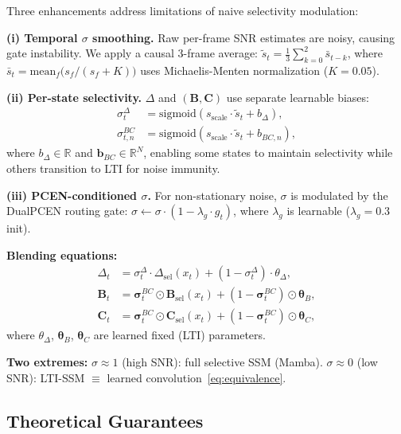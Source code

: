 \documentclass[journal]{IEEEtran}
\begin{document}
Three enhancements address limitations of naive selectivity modulation:

\smallskip\noindent\textbf{(i) Temporal $\sigma$ smoothing.}
Raw per-frame SNR estimates are noisy, causing gate instability. We apply a causal 3-frame average:
$\tilde{s}_t = \frac{1}{3}\sum_{k=0}^{2} \bar{s}_{t-k}$, where $\bar{s}_t = \text{mean}_f\big(s_f/(s_f{+}K)\big)$ uses Michaelis-Menten normalization ($K{=}0.05$).

\smallskip\noindent\textbf{(ii) Per-state selectivity.}
$\Delta$ and $(\mathbf{B}, \mathbf{C})$ use separate learnable biases:
\begin{align}
\sigma^\Delta_t &= \text{sigmoid}(s_{\text{scale}} \cdot \tilde{s}_t + b_\Delta), \label{eq:sigma_dt} \\
\sigma^{BC}_{t,n} &= \text{sigmoid}(s_{\text{scale}} \cdot \tilde{s}_t + b_{BC,n}), \label{eq:sigma_bc}
\end{align}
where $b_\Delta \in \mathbb{R}$ and $\mathbf{b}_{BC} \in \mathbb{R}^N$, enabling some states to maintain selectivity while others transition to LTI for noise immunity.

\smallskip\noindent\textbf{(iii) PCEN-conditioned $\sigma$.}
For non-stationary noise, $\sigma$ is modulated by the DualPCEN routing gate:
$\sigma \leftarrow \sigma \cdot (1 - \lambda_g \cdot g_t)$,
where $\lambda_g$ is learnable ($\lambda_g{=}0.3$ init).

\smallskip\noindent\textbf{Blending equations:}
\begin{align}
\Delta_t &= \sigma^\Delta_t \cdot \Delta_{\text{sel}}(x_t) + (1{-}\sigma^\Delta_t) \cdot \theta_\Delta, \label{eq:blend_dt} \\
\mathbf{B}_t &= \bm{\sigma}^{BC}_t \odot \mathbf{B}_{\text{sel}}(x_t) + (1{-}\bm{\sigma}^{BC}_t) \odot \bm{\theta}_B, \label{eq:blend_b} \\
\mathbf{C}_t &= \bm{\sigma}^{BC}_t \odot \mathbf{C}_{\text{sel}}(x_t) + (1{-}\bm{\sigma}^{BC}_t) \odot \bm{\theta}_C, \label{eq:blend_c}
\end{align}
where $\theta_\Delta$, $\bm{\theta}_B$, $\bm{\theta}_C$ are learned fixed (LTI) parameters.

\smallskip\noindent\textbf{Two extremes:}
$\sigma \approx 1$ (high SNR): full selective SSM (Mamba).
$\sigma \approx 0$ (low SNR): LTI-SSM $\equiv$ learned convolution~\eqref{eq:equivalence}.


\subsection{Theoretical Guarantees}
\end{document}
